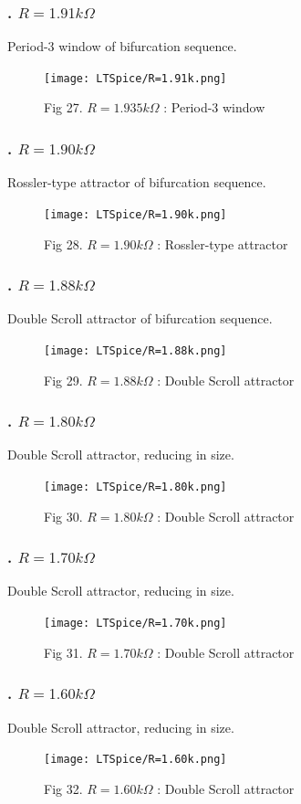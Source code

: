 \documentclass[12pt]{article}
\begin{document}
\subsubsection*{. $R=1.91k\Omega$}
Period-3 window of bifurcation sequence.
\begin{figure}[H] %
	\centering
	\texttt{[image: LTSpice/R=1.91k.png]}
	\caption{Fig 27. $R=1.935k\Omega$ : Period-3 window}
\end{figure}
\subsubsection*{. $R=1.90k\Omega$}
Rossler-type attractor of bifurcation sequence.
\begin{figure}[H] %
	\centering
	\texttt{[image: LTSpice/R=1.90k.png]}
	\caption{Fig 28. $R=1.90k\Omega$ : Rossler-type attractor}
\end{figure}
\subsubsection*{. $R=1.88k\Omega$}
Double Scroll attractor of bifurcation sequence.
\begin{figure}[H] %
	\centering
	\texttt{[image: LTSpice/R=1.88k.png]}
	\caption{Fig 29. $R=1.88k\Omega$ : Double Scroll attractor}
\end{figure}
\subsubsection*{. $R=1.80k\Omega$}
Double Scroll attractor, reducing in size.
\begin{figure}[H] %
	\centering
	\texttt{[image: LTSpice/R=1.80k.png]}
	\caption{Fig 30. $R=1.80k\Omega$ : Double Scroll attractor}
\end{figure}
\subsubsection*{. $R=1.70k\Omega$}
Double Scroll attractor, reducing in size.
\begin{figure}[H] %
	\centering
	\texttt{[image: LTSpice/R=1.70k.png]}
	\caption{Fig 31. $R=1.70k\Omega$ : Double Scroll attractor}
\end{figure}
\subsubsection*{. $R=1.60k\Omega$}
Double Scroll attractor, reducing in size.
\begin{figure}[H] %
	\centering
	\texttt{[image: LTSpice/R=1.60k.png]}
	\caption{Fig 32. $R=1.60k\Omega$ : Double Scroll attractor}
\end{figure}
\end{document}
